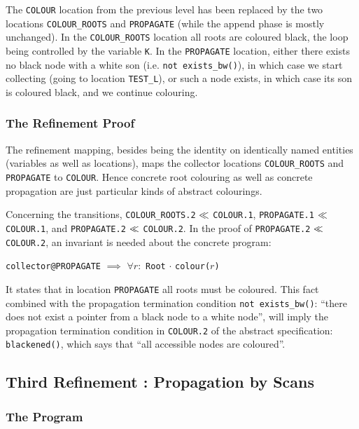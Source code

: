The {\tt COLOUR} location from the previous level has been replaced by
the two locations {\tt  COLOUR\_ROOTS} and {\tt PROPAGATE} (while  the
append phase is mostly unchanged)\@. In the {\tt COLOUR\_ROOTS} location
all roots  are  coloured black,  the  loop  being controlled  by   the
variable {\tt K}\@. In the {\tt PROPAGATE} location, either there exists
no black node with a white son (i.e. {\tt not exists\_bw()}), in which
case we start collecting (going to  location {\tt TEST\_L}), or such a
node exists, in which case its son is coloured black, and we continue
colouring.


\subsubsection{The Refinement Proof}

The  refinement mapping,  besides  being  the identity on  identically
named entities (variables  as well as  locations), maps the collector
locations {\tt COLOUR\_ROOTS} and {\tt PROPAGATE} to {\tt COLOUR}\@.  Hence
concrete   root  colouring as well  as   concrete propagation are just
particular kinds of abstract colourings.

Concerning the transitions,  
{\tt  COLOUR\_ROOTS.2} $\ll$ {\tt  COLOUR.1}, 
{\tt PROPAGATE.1} $\ll$ {\tt  COLOUR.1},  
and
{\tt PROPAGATE.2} $\ll$ {\tt COLOUR.2}. 
In   the proof  of {\tt PROPAGATE.2} $\ll$ {\tt COLOUR.2}, 
an invariant is needed about the concrete program:

\begin{center}
  {\tt collector@PROPAGATE} $\implies$ $\forall r:$ {\tt Root} $\cdot$ 
  {\tt colour(}$r${\tt )}
\end{center}

\noindent
It states that in location {\tt PROPAGATE} all roots must be coloured.
This fact combined with the propagation termination condition {\tt not
  exists\_bw()}: ``there does not exist a pointer from a black node to
a  white node'', will  imply  the propagation termination condition in
{\tt  COLOUR.2} of  the  abstract specification:  {\tt blackened()},
which says that ``all accessible nodes are coloured''.


\subsection{Third Refinement : Propagation by Scans}
\label{third-refinement}

\subsubsection{The Program}

